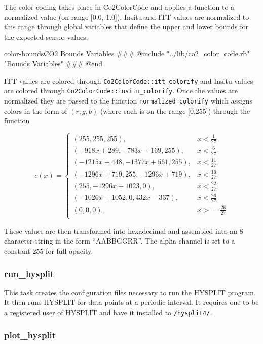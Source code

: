\documentclass[12pt]{article}
\begin{document}
The color coding takes place in Co2ColorCode and applies a function to a normalized value (on range [0.0, 1.0]).  Insitu and ITT values are normalized to this range through global variables that define the upper and lower bounds for the expected sensor values.

\begin{code}{color-bounds}{CO2 Bounds Variables}
### @include "../lib/co2_color_code.rb" "Bounds Variables"
### @end
\end{code}

ITT values are colored through \texttt{Co2ColorCode::itt\_colorify} and Insitu values are colored through \texttt{Co2ColorCode::insitu\_colorify}.  Once the values are normalized they are passed to the function \texttt{normalized\_colorify} which assigns colors in the form of $(r,g,b)$ (where each is on the range [0,255]) through the function

\begin{equation}
\label{normalized-colorify}
c(x)= \begin{cases}
(255,255,255), & x < \frac{1}{27} \\
(-918x+289,-783x+169,255), & x < \frac{6}{27} \\
(-1215x+448,-1377x+561,255), & x < \frac{11}{27} \\
(-1296x+719,255,-1296x+719), & x < \frac{16}{27} \\
(255,-1296x+1023,0), & x < \frac{22}{27} \\
(-1026x+1052,0,432x-337), & x < \frac{26}{27} \\
(0,0,0), & x >= \frac{26}{27} \\
\end{cases}
\end{equation}

These values are then transformed into hexadecimal and assembled into an 8 character string in the form ``AABBGGRR''.  The alpha channel is set to a constant 255 for full opacity.

\subsubsection*{run\_hysplit}

This task creates the configuration files necessary to run the HYSPLIT program.  It then runs HYSPLIT for data points at a periodic interval.  It requires one to be a registered user of HYSPLIT and have it installed to \texttt{/hysplit4/}.

\subsubsection*{plot\_hysplit}
\end{document}
